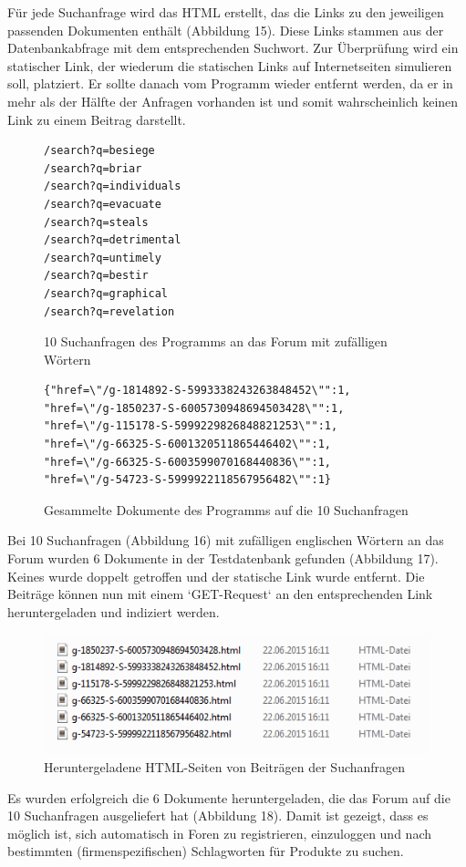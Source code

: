 Für jede Suchanfrage wird das HTML erstellt, das die Links zu den jeweiligen passenden Dokumenten enthält (Abbildung 15). Diese Links stammen aus der Datenbankabfrage mit dem entsprechenden Suchwort.
Zur Überprüfung wird ein statischer Link, der wiederum die statischen Links auf Internetseiten simulieren soll, platziert. Er sollte danach vom Programm wieder entfernt werden, da er in mehr als der Hälfte der Anfragen vorhanden ist und somit wahrscheinlich keinen Link zu einem Beitrag darstellt.

\begin{figure}[h!]
\begin{lstlisting}[language=HTML5]
/search?q=besiege
/search?q=briar
/search?q=individuals
/search?q=evacuate
/search?q=steals
/search?q=detrimental
/search?q=untimely
/search?q=bestir
/search?q=graphical
/search?q=revelation
\end{lstlisting}
\caption{10 Suchanfragen des Programms an das Forum mit zufälligen Wörtern}
\end{figure}

\begin{figure}[h!]
\begin{lstlisting}[language=HTML5]
{"href=\"/g-1814892-S-5993338243263848452\"":1,
"href=\"/g-1850237-S-6005730948694503428\"":1,
"href=\"/g-115178-S-5999229826848821253\"":1,
"href=\"/g-66325-S-6001320511865446402\"":1,
"href=\"/g-66325-S-6003599070168440836\"":1,
"href=\"/g-54723-S-5999922118567956482\"":1}
\end{lstlisting}
\caption{Gesammelte Dokumente des Programms auf die 10 Suchanfragen}
\end{figure}

Bei 10 Suchanfragen (Abbildung 16) mit zufälligen englischen Wörtern an das Forum wurden 6 Dokumente in der Testdatenbank gefunden (Abbildung 17). Keines wurde doppelt getroffen und der statische Link wurde entfernt. Die Beiträge können nun mit einem `GET-Request` an den entsprechenden Link heruntergeladen und indiziert werden.
\newpage

\begin{figure}[h!]
\includegraphics{./images/postdownload.png}
\caption{Heruntergeladene HTML-Seiten von Beiträgen der Suchanfragen}
\end{figure}


Es wurden erfolgreich die 6 Dokumente heruntergeladen, die das Forum auf die 10 Suchanfragen ausgeliefert hat (Abbildung 18).
Damit ist gezeigt, dass es möglich ist, sich automatisch in Foren zu registrieren, einzuloggen und nach bestimmten (firmenspezifischen) Schlagworten für Produkte zu suchen.
\newpage


